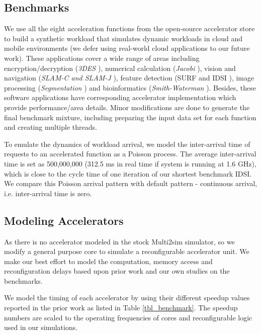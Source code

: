 \subsection{Benchmarks}
We use all the eight acceleration functions from the
open-source accelerator store \cite{accstore} to build a synthetic
workload that simulates dynamic workloads in cloud and mobile
environments (we defer using real-world cloud applications to our
future work).  These applications cover a wide range of areas
including encryption/decryption ({\em 3DES} \cite{openssl}), numerical
calculation ({\em Jacobi} \cite{jacobi-wiki}), vision and navigation
({\em SLAM-C and SLAM-J} \cite{openslam}), feature detection (SURF and
IDSI \cite{opencv}), image processing ({\em Segmentation}
\cite{segmentation-wiki}) and bioinformatics ({\em Smith-Waterman}
\cite{smithwaterman-wiki}). Besides, these software applications have
corresponding accelerator implementation which provide
performance/area details. Minor modifications are done to generate the
final benchmark mixture, including preparing the input data set for
each function and creating multiple threads.

To emulate the dynamics of workload arrival, we model the inter-arrival time of
requests to an accelerated function as a Poisson process. The average
inter-arrival time is set as 500,000,000 (312.5 ms
in real time if system is running at 1.6 GHz), which is close to the
cycle time of one iteration of our shortest benchmark IDSI. We compare
this Poisson arrival pattern with default pattern - continuous
arrival, i.e. inter-arrival time is zero.

\subsection{Modeling Accelerators}
As there is no accelerator modeled in the stock Multi2sim simulator,
so we modify a general purpose core to simulate a reconfigurable
accelerator unit. We make our best effort to model the
computation, memory access and reconfiguration delays  based
upon prior work and our own studies on the benchmarks. 

We model the timing of each accelerator by using their different
speedup values reported in the prior work as listed in Table
\ref{tbl_benchmark}. The speedup numbers are scaled to the 
operating frequencies of cores and reconfigurable logic used in our
simulations. 

